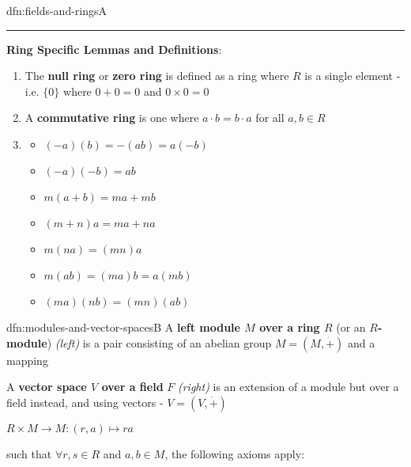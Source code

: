 \documentclass[landscape, 8pt]{extarticle}
\begin{document}
\begin{multicols}{3}
\begin{dfn}{dfn:fields-and-rings}{A}
    \vspace{-10pt}
    \setlength{\columnseprule}{0pt}
    \noindent\rule{\textwidth}{0pt}
    \textbf{Ring Specific Lemmas and Definitions}:
    \begin{enumerate}
        \vspace{-3pt}
        \setlength\itemsep{0em}
        \item The \textbf{null ring} or \textbf{zero ring} is defined as a ring where $R$ is a single element - i.e. $\{0\}$ where $0 + 0 = 0$ and $0 \times 0 = 0$
        \item A \textbf{commutative ring} is one where $a \cdot b = b \cdot a$ for all $a,b\in R$
       \vspace{-15pt}
       \item\begin{multicols}{2}
                \begin{itemize}[leftmargin=*]
                    \item $(-a)(b) = -(ab) = a(-b)$
                    \item $(-a)(-b) = ab$
                    \item $m(a + b) = ma + mb$
                    \item $(m + n)a = ma + na$
                    \item $m(na) = (mn)a$
                    \item $m(ab) = (ma)b = a(mb)$
                    \item $(ma)(nb) = (mn)(ab)$
                \end{itemize}
            \end{multicols}
    \end{enumerate}
\end{dfn}

\vspace{-5pt}
\begin{dfn}{dfn:modules-and-vector-spaces}{B}
    \vspace{-5pt}
    A \textbf{left module $M$ over a ring $R$} (or an \textbf{$R$-module}) \textit{(left)} is a pair consisting of an abelian group $M = (M, \dot{+})$ and a mapping

    A \textbf{vector space $V$ over a field} $F$ \textit{(right)} is an extension of a module but over a field instead, and using vectors - $V = (V, \dot{+})$
    
    \vspace{-15pt}
    \setlength{\columnseprule}{0.5pt}
    \begin{multicols}{2}
        \begin{center}
            $R \times M \to M : (r, a)\mapsto ra$
        \end{center}
        \vspace{-5pt}
        such that $\forall r, s\in R$ and $a,b\in M$, the following axioms apply:



\end{multicols}
\end{dfn}
\end{multicols}
\end{document}
